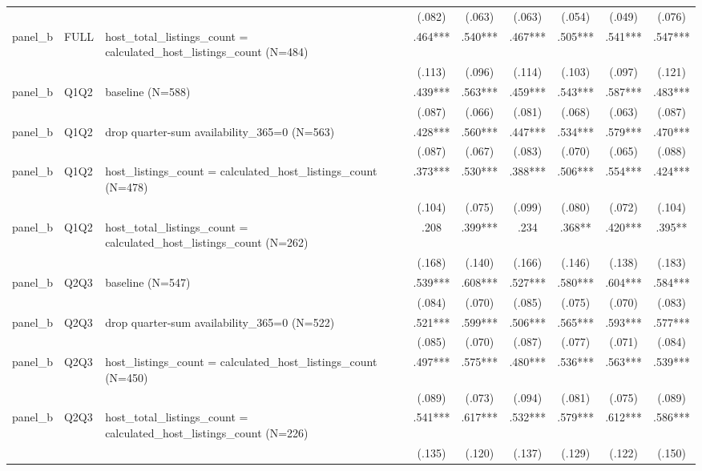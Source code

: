 \begin{tabular}{lllcccccc}
\\
 &  &  & (.082) & (.063) & (.063) & (.054) & (.049) & (.076)
\\
panel\_b & FULL & host\_total\_listings\_count = calculated\_host\_listings\_count (N=484) & .464*** & .540*** & .467*** & .505*** & .541*** & .547***
\\
 &  &  & (.113) & (.096) & (.114) & (.103) & (.097) & (.121)
\\
panel\_b & Q1Q2 & baseline (N=588) & .439*** & .563*** & .459*** & .543*** & .587*** & .483***
\\
 &  &  & (.087) & (.066) & (.081) & (.068) & (.063) & (.087)
\\
panel\_b & Q1Q2 & drop quarter-sum availability\_365=0 (N=563) & .428*** & .560*** & .447*** & .534*** & .579*** & .470***
\\
 &  &  & (.087) & (.067) & (.083) & (.070) & (.065) & (.088)
\\
panel\_b & Q1Q2 & host\_listings\_count = calculated\_host\_listings\_count (N=478) & .373*** & .530*** & .388*** & .506*** & .554*** & .424***
\\
 &  &  & (.104) & (.075) & (.099) & (.080) & (.072) & (.104)
\\
panel\_b & Q1Q2 & host\_total\_listings\_count = calculated\_host\_listings\_count (N=262) & .208 & .399*** & .234 & .368** & .420*** & .395**
\\
 &  &  & (.168) & (.140) & (.166) & (.146) & (.138) & (.183)
\\
panel\_b & Q2Q3 & baseline (N=547) & .539*** & .608*** & .527*** & .580*** & .604*** & .584***
\\
 &  &  & (.084) & (.070) & (.085) & (.075) & (.070) & (.083)
\\
panel\_b & Q2Q3 & drop quarter-sum availability\_365=0 (N=522) & .521*** & .599*** & .506*** & .565*** & .593*** & .577***
\\
 &  &  & (.085) & (.070) & (.087) & (.077) & (.071) & (.084)
\\
panel\_b & Q2Q3 & host\_listings\_count = calculated\_host\_listings\_count (N=450) & .497*** & .575*** & .480*** & .536*** & .563*** & .539***
\\
 &  &  & (.089) & (.073) & (.094) & (.081) & (.075) & (.089)
\\
panel\_b & Q2Q3 & host\_total\_listings\_count = calculated\_host\_listings\_count (N=226) & .541*** & .617*** & .532*** & .579*** & .612*** & .586***
\\
 &  &  & (.135) & (.120) & (.137) & (.129) & (.122) & (.150)
\\

\end{tabular}
